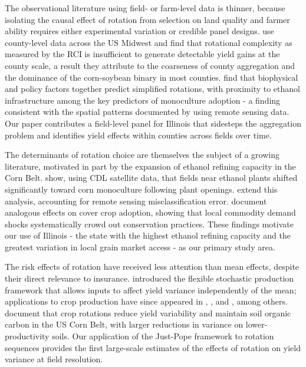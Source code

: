 \documentclass[12pt,letterpaper]{article}
\theoremstyle{remark}
\theoremstyle{plain}
\theoremstyle{definition}
\begin{document}
The observational literature using field- or farm-level data is thinner, because isolating the causal effect of rotation from selection on land quality and farmer ability requires either experimental variation or credible panel designs. \citet{burchfield2024} use county-level data across the US Midwest and find that rotational complexity as measured by the RCI is insufficient to generate detectable yield gains at the county scale, a result they attribute to the coarseness of county aggregation and the dominance of the corn-soybean binary in most counties. \citet{socolar2021} find that biophysical and policy factors together predict simplified rotations, with proximity to ethanol infrastructure among the key predictors of monoculture adoption - a finding consistent with the spatial patterns documented by \citet{pates2021} using remote sensing data. Our paper contributes a field-level panel for Illinois that sidesteps the aggregation problem and identifies yield effects within counties across fields over time.
 
The determinants of rotation choice are themselves the subject of a growing literature, motivated in part by the expansion of ethanol refining capacity in the Corn Belt. \citet{pates2021} show, using CDL satellite data, that fields near ethanol plants shifted significantly toward corn monoculture following plant openings. \citet{Pates2025} extend this analysis, accounting for remote sensing misclassification error. \citet{cheu2025} document analogous effects on cover crop adoption, showing that local commodity demand shocks systematically crowd out conservation practices. These findings motivate our use of Illinois - the state with the highest ethanol refining capacity and the greatest variation in local grain market access - as our primary study area.
 
The risk effects of rotation have received less attention than mean effects, despite their direct relevance to insurance. \citet{Just1979} introduced the flexible stochastic production framework that allows inputs to affect yield variance independently of the mean; applications to crop production have since appeared in \citet{antle1983}, \citet{shi2013}, and \citet{li2021}, among
others. \citet{wu2025} document that crop rotations reduce yield variability and maintain soil organic carbon in the US Corn Belt, with larger reductions in variance on lower-productivity soils. Our application of the Just-Pope framework to rotation sequences provides the first large-scale estimates of the effects of rotation on yield variance at field resolution.
\end{document}
